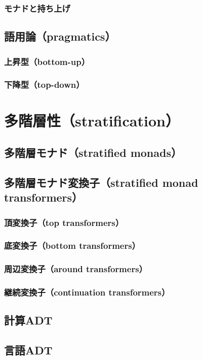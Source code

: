 \documentclass[11pt, oneside]{jsarticle}   	%
\begin{document}
\subsubsection{ モナドと持ち上げ }
\subsection{ 語用論（pragmatics） }
\subsubsection{ 上昇型（bottom-up） }
\subsubsection{ 下降型（top-down） }


\newpage
\section{ 多階層性（stratification）}
\subsection{ 多階層モナド（stratified monads） }
\subsection{ 多階層モナド変換子（stratified monad transformers） }
\subsubsection{ 頂変換子（top transformers） }
\subsubsection{ 底変換子（bottom transformers） }
\subsubsection{ 周辺変換子（around transformers） }
\subsubsection{ 継続変換子（continuation transformers） }
\subsection{ 計算ADT }
\subsection{ 言語ADT }
\end{document}
